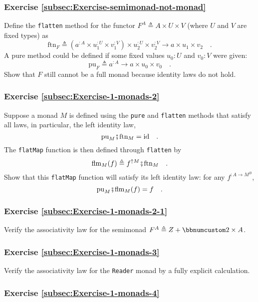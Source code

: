 \subsubsection{Exercise \label{subsec:Exercise-semimonad-not-monad}\ref{subsec:Exercise-semimonad-not-monad}}

Define the \lstinline!flatten! method for the functor $F^{A}\triangleq A\times U\times V$
(where $U$ and $V$ are fixed types) as
\[
\text{ftn}_{F}\triangleq(a^{:A}\times u_{1}^{:U}\times v_{1}^{:V})\times u_{2}^{:U}\times v_{2}^{:V}\rightarrow a\times u_{1}\times v_{2}\quad.
\]
A pure method could be defined if some fixed values $u_{0}:U$ and
$v_{0}:V$ were given:
\[
\text{pu}_{F}\triangleq a^{:A}\rightarrow a\times u_{0}\times v_{0}\quad.
\]
Show that $F$ still cannot be a full monad because identity laws
do not hold.

\subsubsection{Exercise \label{subsec:Exercise-1-monads-2}\ref{subsec:Exercise-1-monads-2}}

Suppose a monad $M$ is defined using the \lstinline!pure! and \lstinline!flatten!
methods that satisfy all laws, in particular, the left identity law,
\[
\text{pu}_{M}\bef\text{ftn}_{M}=\text{id}\quad.
\]
The \lstinline!flatMap! function is then defined through \lstinline!flatten!
by
\[
\text{flm}_{M}(f)\triangleq f^{\uparrow M}\bef\text{ftn}_{M}\quad.
\]
 Show that this \lstinline!flatMap! function will satisfy its left
identity law: for any $f^{:A\rightarrow M^{B}}$,
\[
\text{pu}_{M}\bef\text{flm}_{M}(f)=f\quad.
\]


\subsubsection{Exercise \label{subsec:Exercise-1-monads-2-1}\ref{subsec:Exercise-1-monads-2-1}}

Verify the associativity law for the semimonad $F^{A}\triangleq Z+\bbnum 2\times A$.

\subsubsection{Exercise \label{subsec:Exercise-1-monads-3}\ref{subsec:Exercise-1-monads-3}}

Verify the associativity law for the \lstinline!Reader! monad by
a fully explicit calculation.

\subsubsection{Exercise \label{subsec:Exercise-1-monads-4}\ref{subsec:Exercise-1-monads-4}}

